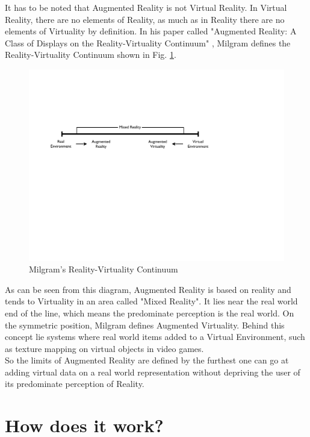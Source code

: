 It has to be noted that Augmented Reality is not Virtual Reality. In Virtual Reality, there are no elements of Reality, as much as in Reality there are no elements of Virtuality by definition. In his paper called "Augmented Reality: A Class of Displays on the Reality-Virtuality Continuum" \cite{Mil94}, Milgram defines the Reality-Virtuality Continuum shown in Fig. \ref{fig:milgram_diagram}.

\begin{figure}[ht]
\center
\includegraphics[scale=0.5]{pics/milgram_diagram}
\caption{Milgram's Reality-Virtuality Continuum \cite{Mil94}}
\label{fig:milgram_diagram}
\end{figure}

As can be seen from this diagram, Augmented Reality is based on reality and tends to Virtuality in an area called "Mixed Reality". It lies near the real world end of the line, which means the predominate perception is the real world. On the symmetric position, Milgram defines Augmented Virtuality. Behind this concept lie systems where real world items added to a Virtual Environment, such as texture mapping on virtual objects in video games.\\

So the limits of Augmented Reality are defined by the furthest one can go at adding virtual data on a real world representation without depriving the user of its predominate perception of Reality.

\section{How does it work?}
\label{sec:how_does_ar_work}

